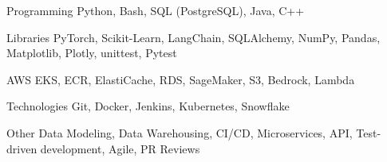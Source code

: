 


\begin{cvskills}


\cvskill
{Programming} %
{Python, Bash, SQL (PostgreSQL), Java, C++} %


\cvskill
{Libraries} %
{PyTorch, Scikit-Learn, LangChain, SQLAlchemy, NumPy, Pandas, Matplotlib, Plotly, unittest, Pytest} %


\cvskill
{AWS} %
{EKS, ECR, ElastiCache, RDS, SageMaker, S3, Bedrock, Lambda} %


\cvskill
{Technologies} %
{Git, Docker, Jenkins, Kubernetes, Snowflake} %


\cvskill
{Other} %
{Data Modeling, Data Warehousing, CI/CD, Microservices, API, Test-driven development, Agile, PR Reviews} %


\end{cvskills}